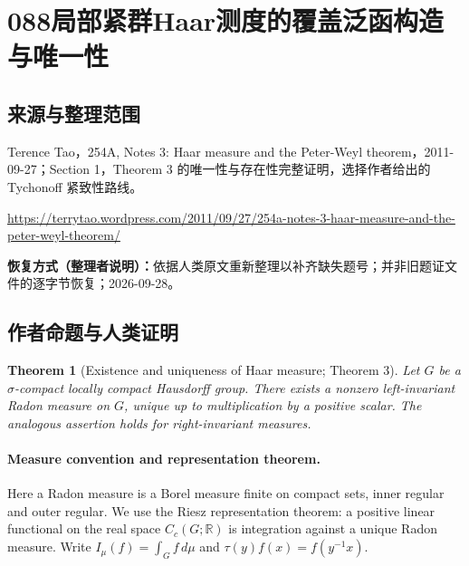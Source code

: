 \documentclass[UTF8,11pt]{ctexart}
\newtheorem*{theorem}{Theorem}
\theoremstyle{definition}
\newcommand{\R}{\mathbb R}
\begin{document}
\section*{088\quad 局部紧群Haar测度的覆盖泛函构造与唯一性}
\subsection*{来源与整理范围}
Terence Tao，254A, Notes 3: Haar measure and the Peter-Weyl theorem，2011-09-27；Section 1，Theorem 3 的唯一性与存在性完整证明，选择作者给出的 Tychonoff 紧致性路线。
\par\url{https://terrytao.wordpress.com/2011/09/27/254a-notes-3-haar-measure-and-the-peter-weyl-theorem/}
\par\textbf{恢复方式（整理者说明）：}依据人类原文重新整理以补齐缺失题号；并非旧题证文件的逐字节恢复；2026-09-28。
\subsection*{作者命题与人类证明}

\begin{theorem}[Existence and uniqueness of Haar measure; Theorem 3]
Let $G$ be a $\sigma$-compact locally compact Hausdorff group. There exists a
nonzero left-invariant Radon measure on $G$, unique up to multiplication by
a positive scalar. The analogous assertion holds for right-invariant
measures.
\end{theorem}
\paragraph{Measure convention and representation theorem.}
Here a Radon measure is a Borel measure finite on compact sets, inner
regular and outer regular. We use the Riesz representation theorem:
a positive linear functional on the real space $C_c(G;\R)$ is integration
against a unique Radon measure. Write $I_\mu(f)=\int_G f\,d\mu$ and
$\tau(y)f(x)=f(y^{-1}x)$.
\end{document}
